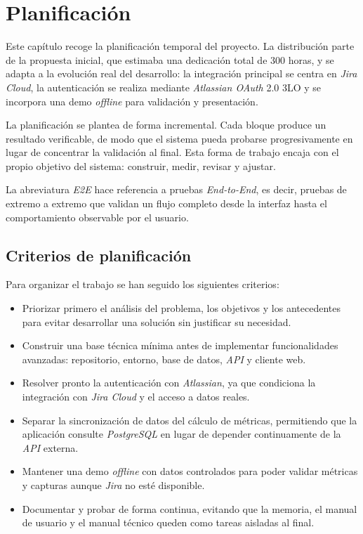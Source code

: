 \chapter{Planificación}
\label{planificacionTemporal}

Este capítulo recoge la planificación temporal del proyecto. La distribución parte de la propuesta inicial, que estimaba una dedicación total de 300 horas, y se adapta a la evolución real del desarrollo: la integración principal se centra en \textit{Jira Cloud}, la autenticación se realiza mediante \textit{Atlassian OAuth} 2.0 3LO y se incorpora una demo \textit{offline} para validación y presentación.

La planificación se plantea de forma incremental. Cada bloque produce un resultado verificable, de modo que el sistema pueda probarse progresivamente en lugar de concentrar la validación al final. Esta forma de trabajo encaja con el propio objetivo del sistema: construir, medir, revisar y ajustar.

La abreviatura \textit{E2E} hace referencia a pruebas \textit{End-to-End}, es decir, pruebas de extremo a extremo que validan un flujo completo desde la interfaz hasta el comportamiento observable por el usuario.

\section{Criterios de planificación}

Para organizar el trabajo se han seguido los siguientes criterios:

\begin{itemize}
    \item Priorizar primero el análisis del problema, los objetivos y los antecedentes para evitar desarrollar una solución sin justificar su necesidad.
    \item Construir una base técnica mínima antes de implementar funcionalidades avanzadas: repositorio, entorno, base de datos, \textit{API} y cliente web.
    \item Resolver pronto la autenticación con \textit{Atlassian}, ya que condiciona la integración con \textit{Jira Cloud} y el acceso a datos reales.
    \item Separar la sincronización de datos del cálculo de métricas, permitiendo que la aplicación consulte \textit{PostgreSQL} en lugar de depender continuamente de la \textit{API} externa.
    \item Mantener una demo \textit{offline} con datos controlados para poder validar métricas y capturas aunque \textit{Jira} no esté disponible.
    \item Documentar y probar de forma continua, evitando que la memoria, el manual de usuario y el manual técnico queden como tareas aisladas al final.
\end{itemize}


